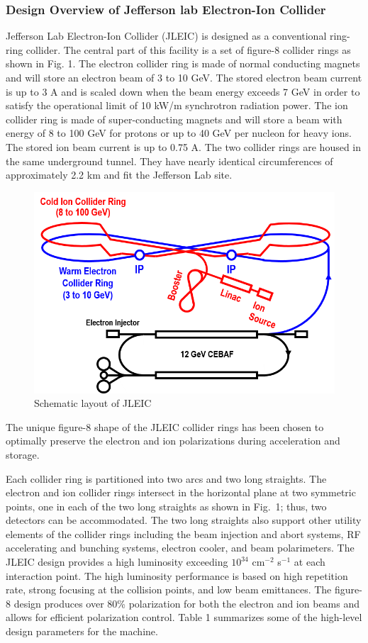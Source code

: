 \subsubsection{Design Overview of Jefferson lab Electron-Ion Collider}
Jefferson Lab Electron-Ion Collider (JLEIC) is designed as a conventional ring-ring collider.
The central part of this facility is a set of figure-8 collider rings as shown in Fig. 1. The electron collider ring is made of normal conducting magnets and will store an electron beam of 3 to 10 GeV. The stored electron beam current is up to 3 A and is scaled down when the beam energy exceeds 7 GeV in order to satisfy the operational limit of 10 kW/m synchrotron radiation power. The ion collider ring is made of super-conducting magnets and will store a beam with energy of 8 to 100 GeV for protons or up to 40 GeV per nucleon for heavy ions. The stored ion beam current is up to 0.75 A. The two collider rings are housed in the same underground tunnel. They have nearly identical circumferences of approximately 2.2 km and fit the Jefferson Lab site.

\begin{figure}
	\centering
	\includegraphics[width=.75\textwidth]{../../img/jleic_schematic.png}
	\caption{Schematic layout of JLEIC}
	\label{fig:jleic1}
\end{figure}

The unique figure-8 shape of the JLEIC collider rings has been chosen to optimally preserve the electron and ion polarizations during acceleration and storage.%

Each collider ring is partitioned into two arcs and two long straights. The electron and ion collider rings intersect in the horizontal plane at two symmetric points, one in each of the two long straights as shown in Fig. 1; thus, two detectors can be accommodated. The two long straights also support other utility elements of the collider rings including the beam injection and abort systems, RF accelerating and bunching systems, electron cooler, and beam polarimeters.
The JLEIC design provides a high luminosity exceeding $10^{34}$ cm$^{-2}$ s$^{-1}$ at each interaction point. The high luminosity performance is based on high repetition rate, strong focusing at the collision points, and low beam emittances. The figure-8 design produces over 80\% polarization for both the electron and ion beams and allows for efficient polarization control. Table 1 summarizes some of the high-level design parameters for the machine.

